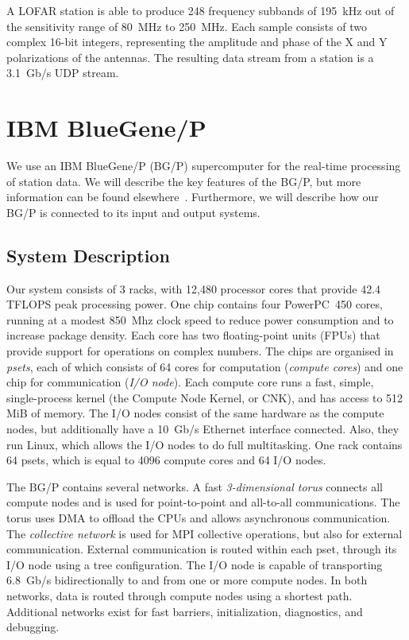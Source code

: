 \documentclass{llncs}
\begin{document}
A LOFAR station is able to produce 248 frequency subbands of 195~kHz out of the sensitivity range of 80~MHz to 250~MHz. Each sample consists of two complex 16-bit integers, representing the amplitude and phase of the X and Y polarizations of the antennas. The resulting data stream from a station is a 3.1~Gb/s UDP stream.


\section{IBM BlueGene/P}

We use an IBM BlueGene/P (BG/P) supercomputer for the real-time processing of station data. We will describe the key features of the BG/P, but more information can be found elsewhere~\cite{IBM:08}. Furthermore, we will describe how our BG/P is connected to its input and output systems.

\subsection{System Description}

Our system consists of 3 racks, with 12,480 processor cores that provide 42.4 TFLOPS peak processing power. One chip contains four PowerPC~450 cores, running at a modest 850~Mhz clock speed to reduce power consumption and to increase package density. Each core has two floating-point units (FPUs) that provide support for operations on complex numbers. The chips are organised in \emph{psets}, each of which consists of 64 cores for computation (\emph{compute cores}) and one chip for communication (\emph{I/O node}). Each compute core runs a fast, simple, single-process kernel (the Compute Node Kernel, or CNK), and has access to 512 MiB of memory. The I/O nodes consist of the same hardware as the compute nodes, but additionally have a 10~Gb/s Ethernet interface connected. Also, they run Linux, which allows the I/O nodes to do full multitasking. One rack contains 64 psets, which is equal to 4096 compute cores and 64 I/O nodes.

The BG/P contains several networks. A fast \emph{3-dimensional torus\/} connects all compute nodes and is used for point-to-point and all-to-all communications. The torus uses DMA to offload the CPUs and allows asynchronous communication. The \emph{collective network\/} is used for MPI collective operations, but also for external communication. External communication is routed within each pset, through its I/O node using a tree configuration. The I/O node is capable of transporting 6.8~Gb/s bidirectionally to and from one or more compute nodes. In both networks, data is routed through compute nodes using a shortest path. Additional networks exist for fast barriers, initialization, diagnostics, and debugging. %
\end{document}
